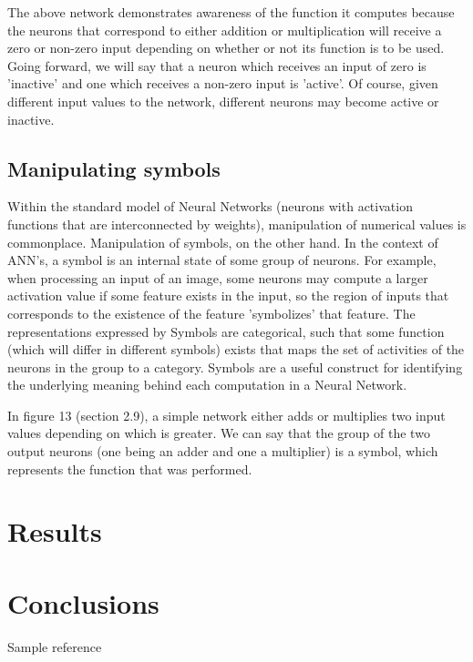 \documentclass{article}
\begin{document}
		The above network demonstrates awareness of the function it computes because the neurons that correspond to either addition or multiplication will receive a zero or non-zero input depending on whether or not its function is to be used. Going forward, we will say that a neuron which receives an input of zero is 'inactive' and one which receives a non-zero input is 'active'. Of course, given different input values to the network, different neurons may become active or inactive. 
	
	\subsection{Manipulating symbols}
	
		Within the standard model of Neural Networks (neurons with activation functions that are interconnected by weights), manipulation of numerical values is commonplace. Manipulation of symbols, on the other hand. In the context of ANN's, a symbol is an internal state of some group of neurons. For example, when processing an input of an image, some neurons may compute a larger activation value if some feature exists in the input, so the region of inputs that corresponds to the existence of the feature 'symbolizes' that feature. The representations expressed by Symbols are categorical, such that some function (which will differ in different symbols) exists that maps the set of activities of the neurons in the group to a category. Symbols are a useful construct for identifying the underlying meaning behind each computation in a Neural Network.
		
		In figure 13 (section 2.9), a simple network either adds or multiplies two input values depending on which is greater. We can say that the group of the two output neurons (one being an adder and one a multiplier) is a symbol, which represents the function that was performed.
	
	\section{Results}
	
	\section{Conclusions}
	
	\begin{thebibliography}{9}
		Sample reference 
	\end{thebibliography}
\end{document}
